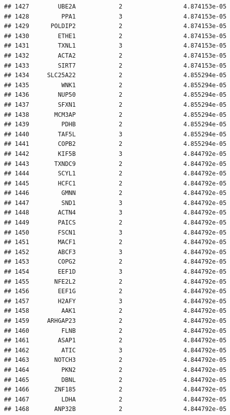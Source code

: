 \documentclass[
]{article}
\begin{document}
\begin{verbatim}
## 1427        UBE2A            2                 4.874153e-05
## 1428         PPA1            3                 4.874153e-05
## 1429      POLDIP2            2                 4.874153e-05
## 1430        ETHE1            2                 4.874153e-05
## 1431        TXNL1            3                 4.874153e-05
## 1432        ACTA2            2                 4.874153e-05
## 1433        SIRT7            2                 4.874153e-05
## 1434     SLC25A22            2                 4.855294e-05
## 1435         WNK1            2                 4.855294e-05
## 1436        NUP50            2                 4.855294e-05
## 1437        SFXN1            2                 4.855294e-05
## 1438       MCM3AP            2                 4.855294e-05
## 1439         PDHB            2                 4.855294e-05
## 1440        TAF5L            3                 4.855294e-05
## 1441        COPB2            2                 4.855294e-05
## 1442        KIF5B            3                 4.844792e-05
## 1443       TXNDC9            2                 4.844792e-05
## 1444        SCYL1            2                 4.844792e-05
## 1445        HCFC1            2                 4.844792e-05
## 1446         GMNN            2                 4.844792e-05
## 1447         SND1            3                 4.844792e-05
## 1448        ACTN4            3                 4.844792e-05
## 1449        PAICS            2                 4.844792e-05
## 1450        FSCN1            3                 4.844792e-05
## 1451        MACF1            2                 4.844792e-05
## 1452        ABCF3            3                 4.844792e-05
## 1453        COPG2            2                 4.844792e-05
## 1454        EEF1D            3                 4.844792e-05
## 1455       NFE2L2            2                 4.844792e-05
## 1456        EEF1G            2                 4.844792e-05
## 1457        H2AFY            3                 4.844792e-05
## 1458         AAK1            2                 4.844792e-05
## 1459     ARHGAP23            2                 4.844792e-05
## 1460         FLNB            2                 4.844792e-05
## 1461        ASAP1            2                 4.844792e-05
## 1462         ATIC            3                 4.844792e-05
## 1463       NOTCH3            2                 4.844792e-05
## 1464         PKN2            2                 4.844792e-05
## 1465         DBNL            2                 4.844792e-05
## 1466       ZNF185            2                 4.844792e-05
## 1467         LDHA            2                 4.844792e-05
## 1468       ANP32B            2                 4.844792e-05

\end{verbatim}
\end{document}
